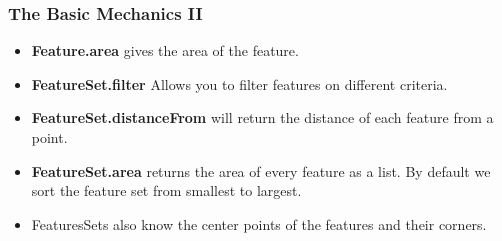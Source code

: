 \documentclass{beamer}
\begin{document}
\begin{frame}
  \frametitle{The Basic Mechanics II}

\begin{itemize}
\item \textbf{Feature.area} gives the area of the feature.
\item \textbf{FeatureSet.filter} Allows you to filter features on
  different criteria.
\item \textbf{FeatureSet.distanceFrom} will return the distance of
  each feature from a point.
\item \textbf{FeatureSet.area} returns the area of every feature as a
  list. By default we sort the feature set from smallest to largest.
\item FeaturesSets also know the center points of the features and
  their corners. 
\end{itemize}
\end{frame}
\end{document}
